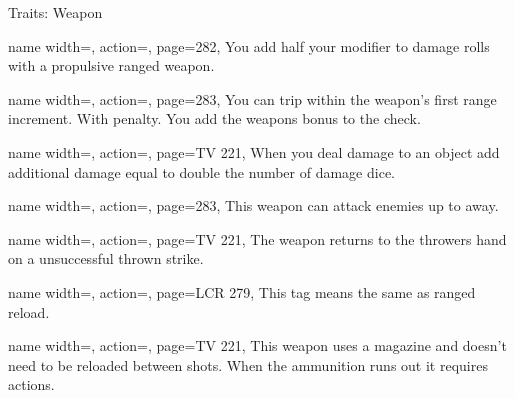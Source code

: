 \begin{PageBack}
\begin{Tables}{\backTableHeight}
\begin{Table}{Traits: Weapon}
\begin{entry}{}{%
                name width=\conditionLength,%
                action=\Propulsive,
                page=282,
            }
                You add half your \Strength modifier to damage rolls with a propulsive ranged weapon. \hfill
            \end{entry}
            \begin{entry}{}{%
                name width=\conditionLength,%
                action=\RangedTrip,
                page=283,
            }
                You can trip within the weapon's first range increment.
                With  \Cirm penalty. \hfill
                You add the weapons \Item bonus to the check.
            \end{entry}
            \begin{entry}{}{%
                name width=\conditionLength,%
                action=\Razing,
                page=TV 221,
            }
                When you deal damage to an object add additional damage equal to double the number of damage dice.
            \end{entry}
            \begin{entry}{}{%
                name width=\conditionLength,%
                action=\Reach,
                page=283,
            }
                This weapon can attack enemies up to  \Feet away. \hfill
            \end{entry}
            \begin{entry}{}{%
                name width=\conditionLength,%
                action=\Recovery,
                page=TV 221,
            }
                The weapon returns to the throwers hand on a unsuccessful thrown strike.
            \end{entry}
            \begin{entry}{}{%
                name width=\conditionLength,%
                action=\Reload,
                page=LCR 279,
            }
                This tag means the same as ranged reload.
            \end{entry}
            \begin{entry}{}{%
                name width=\conditionLength,%
                action=\Repeating,
                page=TV 221,
            }
                This weapon uses a magazine and  doesn't need to be reloaded between shots.\hfill
                When the ammunition runs out it requires   actions.
            \end{entry}

\end{Table}
\end{Tables}
\end{PageBack}
